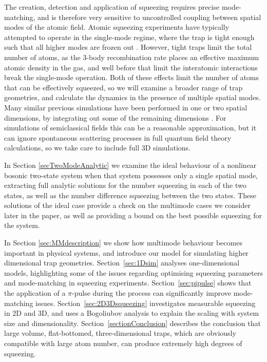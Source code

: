 \documentclass{iopart}
\begin{document}
The creation, detection and application of squeezing requires precise mode-matching, and is therefore very sensitive to uncontrolled coupling between spatial modes of the atomic field.  Atomic squeezing experiments have typically attempted to operate in the single-mode regime, where the trap is tight enough such that all higher modes are frozen out \cite{LiET2009}.  However, tight traps limit the total number of atoms, as the 3-body recombination rate places an effective maximum atomic density in the gas, and well before that limit the interatomic interactions break the single-mode operation.  Both of these effects limit the number of atoms that can be effectively squeezed, so we will examine a broader range of trap geometries, and calculate the dynamics in the presence of multiple spatial modes.
Many similar previous simulations have been performed in one or two spatial dimensions, by integrating out some of the remaining dimensions \cite{Kheruntsyan:2005, johnssonET2007, haineET2009, kheruntsyanET2002}.  For simulations of semiclassical fields this can be a reasonable approximation, but it can ignore spontaneous scattering processes in full quantum field theory calculations, so we take care to include full 3D simulations. 

In Section \ref{secTwoModeAnalytic} we examine the ideal behaviour of a nonlinear bosonic two-state system when that system possesses only a single spatial mode, extracting full analytic solutions for the number squeezing in each of the two states, as well as the number difference squeezing between the two states. These solutions of the ideal case provide a check on the multimode cases we consider later in the paper, as well as providing a bound on the best possible squeezing for the system.

In Section \ref{sec:MMdescription} we show how multimode behaviour becomes important in physical systems, and introduce our model for simulating higher dimensional trap geometries.  Section~\ref{sec:1Dsim} analyses one-dimensional models, highlighting some of the issues regarding optimising squeezing parameters and mode-matching in squeezing experiments.  Section~\ref{sec:pipulse} shows that the application of a $\pi$-pulse during the process can significantly improve mode-matching issues.  Section~\ref{sec:2D3Dsqueezing} investigates measurable squeezing in 2D and 3D, and uses a Bogoliubov analysis to explain the scaling with system size and dimensionality. Section~\ref{sectionConclusion} describes the conclusion that large volume, flat-bottomed, three-dimensional traps, which are obviously compatible with large atom number, can produce extremely high degrees of squeezing.
\end{document}
